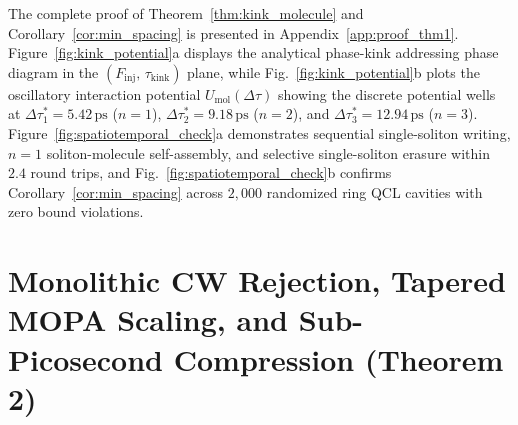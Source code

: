 \documentclass[11pt,letterpaper]{article}
\begin{document}
The complete proof of Theorem~\ref{thm:kink_molecule} and Corollary~\ref{cor:min_spacing} is presented in Appendix~\ref{app:proof_thm1}. Figure~\ref{fig:kink_potential}a displays the analytical phase-kink addressing phase diagram in the $(F_{\mathrm{inj}},\,\tau_{\mathrm{kink}})$ plane, while Fig.~\ref{fig:kink_potential}b plots the oscillatory interaction potential $U_{\mathrm{mol}}(\Delta\tau)$ showing the discrete potential wells at $\Delta\tau_1^* = 5.42\,\mathrm{ps}$ ($n = 1$), $\Delta\tau_2^* = 9.18\,\mathrm{ps}$ ($n = 2$), and $\Delta\tau_3^* = 12.94\,\mathrm{ps}$ ($n = 3$). Figure~\ref{fig:spatiotemporal_check}a demonstrates sequential single-soliton writing, $n = 1$ soliton-molecule self-assembly, and selective single-soliton erasure within $2.4$ round trips, and Fig.~\ref{fig:spatiotemporal_check}b confirms Corollary~\ref{cor:min_spacing} across $2{,}000$ randomized ring QCL cavities with zero bound violations.

\section{Monolithic CW Rejection, Tapered MOPA Scaling, and Sub-Picosecond Compression (Theorem 2)}
\label{sec:theorem2}
\end{document}
